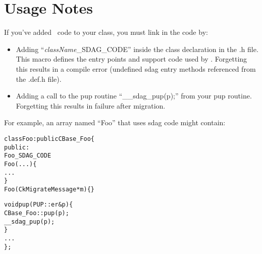 \section{Usage Notes}

If you've added \sdag\ code to your class, you must link in the code by:
\begin{itemize}
  \item Adding ``{\it className}\_SDAG\_CODE'' inside the class declaration
     in the .h file.  This macro defines the entry points and support
     code used by \sdag{}.  Forgetting this results in a compile error
     (undefined sdag entry methods referenced from the .def.h file).
  \item Adding a call to the pup routine ``\_\_sdag\_pup(p);'' from your pup routine.
     Forgetting this results in failure after migration.
\end{itemize}
For example, an array named ``Foo'' that uses sdag code might contain:
\begin{center}
\begin{alltt}
class Foo : public CBase_Foo \{
public:
    Foo_SDAG_CODE
    Foo(...) \{
       ...
    \}
    Foo(CkMigrateMessage *m) \{ \}
    
    void pup(PUP::er &p) \{
       CBase_Foo::pup(p);
       __sdag_pup(p);
    \}
    . . .
\};
\end{alltt}
\end{center}

